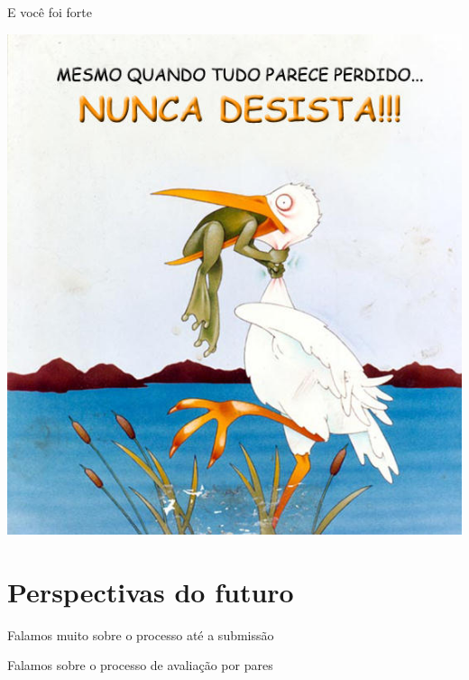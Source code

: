 \documentclass{beamer}
\begin{document}
\begin{frame}{E você foi forte}
  \begin{center}
    \includegraphics[height=.75\textheight]{Encerramento/naodesista3}

    \vfill
  \end{center}
\end{frame}

\section{Perspectivas do futuro}

\begin{frame}
  \begin{center}
    Falamos muito sobre o processo até a submissão

  \end{center}
\end{frame}

\begin{frame}
  \begin{center}
    Falamos sobre o processo de avaliação por pares

  \end{center}
\end{frame}
\end{document}
